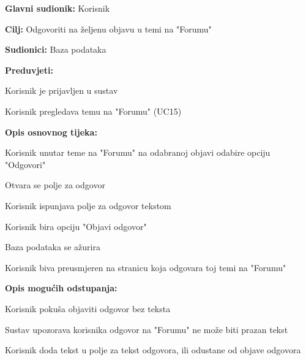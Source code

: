 					\begin{packed_item}
	
						\item \textbf{Glavni sudionik: }Korisnik
						\item  \textbf{Cilj:} Odgovoriti na željenu objavu u temi na "Forumu"
						\item  \textbf{Sudionici:} Baza podataka
						\item  \textbf{Preduvjeti:}
						\item[] \begin{packed_enum}
							\item Korisnik je prijavljen u sustav
							\item Korisnik pregledava temu na "Forumu" (UC15)
						\end{packed_enum}
						\item  \textbf{Opis osnovnog tijeka:}
						
						\item[] \begin{packed_enum}
	
							\item Korisnik unutar teme na "Forumu" na odabranoj objavi odabire opciju "Odgovori"
							\item Otvara se polje za odgovor
							\item Korisnik ispunjava polje za odgovor tekstom
							\item Korisnik bira opciju "Objavi odgovor"
							\item Baza podataka se ažurira
							\item Korisnik biva preusmjeren na stranicu koja odgovara toj temi na "Forumu"
							
							
						\end{packed_enum}
						
						\item  \textbf{Opis mogućih odstupanja:}
						
						\item[] \begin{packed_item}
						\item[3.a] Korisnik pokuša objaviti odgovor bez teksta
							\item[] \begin{packed_enum}
								
								\item Sustav upozorava korisnika odgovor na "Forumu" ne može biti prazan tekst
								\item Korisnik doda tekst u polje za tekst odgovora, ili odustane od objave odgovora
								
							\end{packed_enum}
						
						
					\end{packed_item}
					\end{packed_item}
